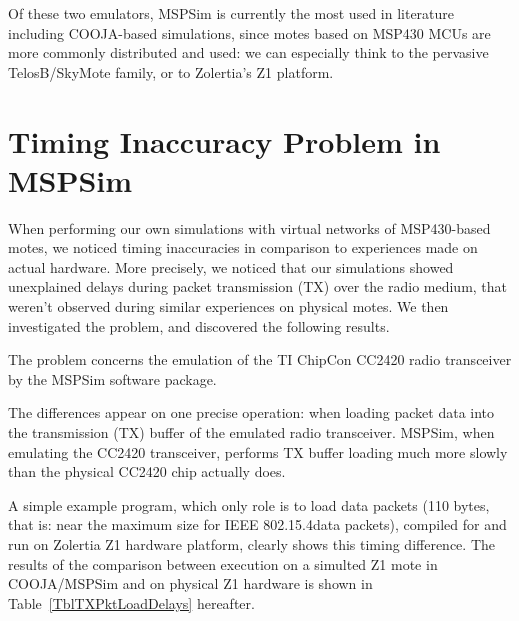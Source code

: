 \documentclass[a4paper,10pt]{article}
\begin{document}
Of these two emulators, MSPSim is currently the most used in literature
including COOJA-based simulations, since motes based on MSP430 MCUs are
more commonly distributed and used: we can especially think to the pervasive
TelosB/SkyMote family, or to Zolertia's Z1 platform.


\section{Timing Inaccuracy Problem in MSPSim}

When performing our own simulations with virtual networks of MSP430-based
motes, we noticed timing inaccuracies in comparison to experiences made
on actual hardware. More precisely, we noticed that our simulations showed
unexplained delays during packet transmission (TX) over the radio medium,
that weren't observed during similar experiences on physical motes.
We then investigated the problem, and discovered the following results.

The problem concerns the emulation of the TI ChipCon CC2420 radio
transceiver by the MSPSim software package.

The differences appear on one precise operation: when loading packet data
into the transmission (TX) buffer of the emulated radio transceiver.
MSPSim, when emulating the CC2420 transceiver, performs TX buffer loading
much more slowly than the physical CC2420 chip actually does.

A simple example program, which only role is to load data packets
(110 bytes, that is: near the maximum size for IEEE
802.15.4\footnotemark[1] data packets), compiled for and run on
Zolertia Z1 hardware platform, clearly shows this timing difference.
The results of the comparison between execution on a simulted Z1 mote
in COOJA/MSPSim and on physical Z1 hardware is shown in
Table~\ref{TblTXPktLoadDelays} hereafter.

\end{document}
